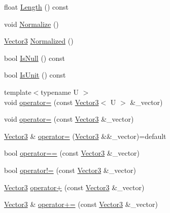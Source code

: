 \begin{DoxyCompactItemize}
float \mbox{\hyperlink{structpad_1_1math_1_1_vector3_a9461a10c56017a46fe943a89d6390d38}{Length}} () const
\item 
void \mbox{\hyperlink{structpad_1_1math_1_1_vector3_a76c70ba64ff0c1b27e26d444bfdd3de5}{Normalize}} ()
\item 
\mbox{\hyperlink{structpad_1_1math_1_1_vector3}{Vector3}} \mbox{\hyperlink{structpad_1_1math_1_1_vector3_a1eeab221ba8b7ea8d0a7d1da8b404037}{Normalized}} ()
\item 
bool \mbox{\hyperlink{structpad_1_1math_1_1_vector3_a47a83130cf6e4210a5a3d7f8ac7bb70a}{Is\+Null}} () const
\item 
bool \mbox{\hyperlink{structpad_1_1math_1_1_vector3_ab8816c85165ed684cb521f3647dff935}{Is\+Unit}} () const
\item 
{\footnotesize template$<$typename U $>$ }\\void \mbox{\hyperlink{structpad_1_1math_1_1_vector3_a33986a35c9534de7caec3353e19f0b10}{operator=}} (const \mbox{\hyperlink{structpad_1_1math_1_1_vector3}{Vector3}}$<$ U $>$ \&\+\_\+vector)
\item 
void \mbox{\hyperlink{structpad_1_1math_1_1_vector3_aabaa38eda86b1ebc0ad7b10ce3dd146e}{operator=}} (const \mbox{\hyperlink{structpad_1_1math_1_1_vector3}{Vector3}} \&\+\_\+vector)
\item 
\mbox{\hyperlink{structpad_1_1math_1_1_vector3}{Vector3}} \& \mbox{\hyperlink{structpad_1_1math_1_1_vector3_af89a8db6bdfd4ce06a96e63021e9ed9a}{operator=}} (\mbox{\hyperlink{structpad_1_1math_1_1_vector3}{Vector3}} \&\&\+\_\+vector)=default
\item 
bool \mbox{\hyperlink{structpad_1_1math_1_1_vector3_a8366aa2e0deb2f3581c9aa8e9d8838f6}{operator==}} (const \mbox{\hyperlink{structpad_1_1math_1_1_vector3}{Vector3}} \&\+\_\+vector)
\item 
bool \mbox{\hyperlink{structpad_1_1math_1_1_vector3_a3f24df3c362f90ca6a02bfb40ccd6882}{operator!=}} (const \mbox{\hyperlink{structpad_1_1math_1_1_vector3}{Vector3}} \&\+\_\+vector)
\item 
\mbox{\hyperlink{structpad_1_1math_1_1_vector3}{Vector3}} \mbox{\hyperlink{structpad_1_1math_1_1_vector3_a63632a298e724533cac1011dacff74b3}{operator+}} (const \mbox{\hyperlink{structpad_1_1math_1_1_vector3}{Vector3}} \&\+\_\+vector)
\item 
\mbox{\hyperlink{structpad_1_1math_1_1_vector3}{Vector3}} \& \mbox{\hyperlink{structpad_1_1math_1_1_vector3_a250f7ccf1fd5f387dd8292c224b08c9e}{operator+=}} (const \mbox{\hyperlink{structpad_1_1math_1_1_vector3}{Vector3}} \&\+\_\+vector)

\end{DoxyCompactItemize}
